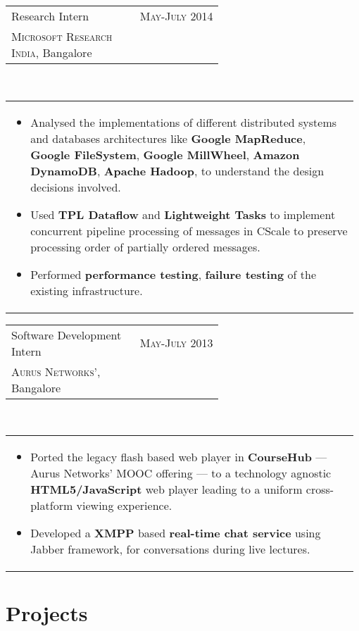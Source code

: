 \documentclass[a4paper]{article} %
\newcommand{\verticalspacing}{-0.25cm}
\newcommand{\bulletspace}{0.7cm}
\newcommand{\projectheadspacing}{6.9cm}
\newcommand{\cproject}[5]{%
    \begin{tabular}{p{0.60\linewidth}r}
        \textcolor{NavyBlue}{\small #2} & \multicolumn{1}{m{ \projectheadspacing{} }}{\raggedleft \small {\textsc{#1}}}\\
        \small {#3} & \small {#4}
    \end{tabular}\\
    \begin{tabular}{p{0.98\linewidth}}
    \vspace{-0.3cm}
        \small{#5}
    \end{tabular}
    \vspace{\verticalspacing{}}
}
\begin{document}
\cproject
      {May-July 2014}
      {Research Intern}
      {\textsc{Microsoft Research India}, Bangalore}
      {}
      {%
          \begin{itemize}[leftmargin=\bulletspace{}]
              \item Analysed the implementations of different distributed systems and databases architectures like
                  \textbf{Google MapReduce}, \textbf{Google FileSystem}, \textbf{Google MillWheel},
                  \textbf{Amazon DynamoDB}, \textbf{Apache Hadoop}, to understand the design decisions involved.
              \item Used \textbf{TPL Dataflow} and \textbf{Lightweight Tasks} to implement concurrent pipeline
                  processing of messages in CScale to preserve processing order of partially ordered messages.
              \item Performed \textbf{performance testing}, \textbf{failure testing} of the existing infrastructure.
          \end{itemize}
     }

\cproject
    {May-July 2013}
    {Software Development Intern}
    {\textsc{Aurus Networks'}, Bangalore}
    {}
    {%
        \begin{itemize}[leftmargin=\bulletspace{}]
            \item Ported the legacy flash based web player in \textbf{CourseHub} --- Aurus Networks'
                MOOC offering --- to a technology agnostic \textbf{HTML5/JavaScript} web player leading
                to a uniform cross-platform viewing experience.
            \item Developed a \textbf{XMPP} based \textbf{real-time chat service} using Jabber framework,
                for conversations during live lectures.
        \end{itemize}
    }

\vspace{-0.35cm}
\section{Projects}

\end{document}
